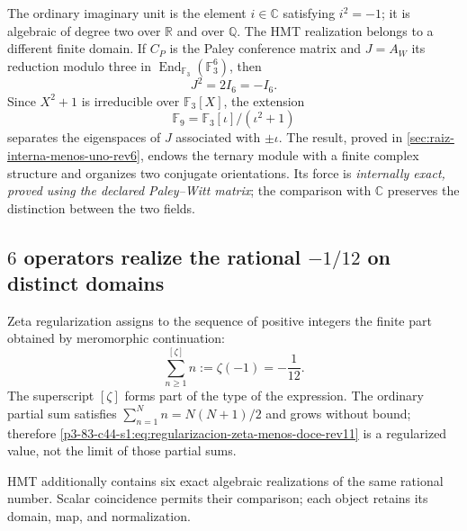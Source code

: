 The ordinary imaginary unit is the element
\(i\in\mathbb C\) satisfying \(i^2=-1\); it is algebraic of degree two over
\(\mathbb R\) and over \(\mathbb Q\). The HMT realization belongs to a
different finite domain. If \(C_P\) is the Paley conference matrix and
\(J=A_W\) its reduction modulo three in
\(\operatorname{End}_{\mathbb F_3}(\mathbb F_3^6)\), then
\begin{equation}
 \boxed{J^2=2I_6=-I_6.}
 \label{p3-83-c44-s1:eq:raiz-interna-menos-uno-ontologia-rev11}
\end{equation}
Since \(X^2+1\) is irreducible over \(\mathbb F_3[X]\), the extension
\[
 \mathbb F_9=\mathbb F_3[\iota]/(\iota^2+1)
\]
separates the eigenspaces of \(J\) associated with \(\pm\iota\). The result,
proved in \cref{sec:raiz-interna-menos-uno-rev6}, endows the ternary module with a
finite complex structure and organizes two conjugate orientations. Its force
is \emph{internally exact, proved using the declared Paley--Witt matrix}; the
comparison with \(\mathbb C\) preserves the distinction between the two fields.

\subsection{\(6\) operators realize the rational
\texorpdfstring{\( -1/12 \)}{-1/12} on distinct domains}

Zeta regularization assigns to the sequence of positive integers the finite
part obtained by meromorphic continuation:
\begin{equation}
 \sum_{n\geq1}^{[\zeta]}n
 :=\zeta(-1)=-\frac1{12}.
 \label{p3-83-c44-s1:eq:regularizacion-zeta-menos-doce-rev11}
\end{equation}
The superscript \([\zeta]\) forms part of the type of the expression. The ordinary
partial sum satisfies
\(\sum_{n=1}^{N}n=N(N+1)/2\) and grows without bound; therefore
\eqref{p3-83-c44-s1:eq:regularizacion-zeta-menos-doce-rev11} is a regularized value, not
the limit of those partial sums.

HMT additionally contains six exact algebraic realizations of
the same rational number. Scalar coincidence permits their comparison; each
object retains its domain, map, and normalization.

